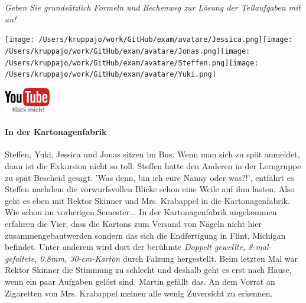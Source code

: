 \documentclass[a4paper, 9pt]{scrartcl}\usepackage[]{graphicx}\usepackage[]{xcolor}
\begin{document}
\textit{Geben Sie grundsätzlich Formeln und Rechenweg zur Lösung der Teilaufgaben mit an!} \\[1Ex]
 

 
\begin{minipage}[t]{0.5\textwidth}
\texttt{[image: /Users/kruppajo/work/GitHub/exam/avatare/Jessica.png]}\hspace{-4mm}\texttt{[image: /Users/kruppajo/work/GitHub/exam/avatare/Jonas.png]}\hspace{-4mm}\texttt{[image: /Users/kruppajo/work/GitHub/exam/avatare/Steffen.png]}\hspace{-4mm}\texttt{[image: /Users/kruppajo/work/GitHub/exam/avatare/Yuki.png]}
\end{minipage}
\begin{minipage}[t]{0.5\textwidth}
\hfill
\href{https://youtu.be/RuzMjwvwT-4}{\includegraphics[width = 2cm]{img/youtube}}
\end{minipage}




\paragraph{In der Kartonagenfabrik}



Steffen, Yuki, Jessica und Jonas sitzen im Bus. Wenn man sich zu spät anmeldet, dann ist die Exkursion nicht so toll. Steffen hatte den Anderen in der Lerngruppe zu spät Bescheid gesagt. 'Was denn, bin ich eure Nanny oder was?!', entfährt es Steffen nachdem die vorwurfsvollen Blicke schon eine Weile auf ihm lasten. Also geht es eben mit Rektor Skinner und Mrs. Krabappel in die Kartonagenfabrik. Wie schon im vorherigen Semester... In der Kartonagenfabrik angekommen erfahren die Vier, dass die Kartons zum Versand von Nägeln nicht hier zusammengebautwerden sondern das sich die Endfertigung in Flint, Michigan befindet. Unter anderem wird dort der berühmte \textit{Doppelt gewellte, 8-mal-gefaltete, 0.8mm, 30-cm-Karton} durch
Falzung hergestellt. Beim letzten Mal war Rektor Skinner die Stimmung zu schlecht und deshalb geht es erst nach Hause, wenn ein paar Aufgaben gelöst sind. Martin gefällt das. An dem Vorrat an Zigaretten von Mrs. Krabappel meinen alle wenig Zuversicht zu erkennen.\\
\end{document}

